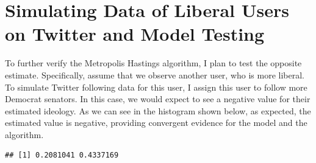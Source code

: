 \documentclass[]{book}
\newenvironment{Shaded}{\begin{snugshade}}{\end{snugshade}}
\newcommand{\KeywordTok}[1]{\textcolor[rgb]{0.13,0.29,0.53}{\textbf{#1}}}
\newcommand{\DataTypeTok}[1]{\textcolor[rgb]{0.13,0.29,0.53}{#1}}
\newcommand{\DecValTok}[1]{\textcolor[rgb]{0.00,0.00,0.81}{#1}}
\newcommand{\StringTok}[1]{\textcolor[rgb]{0.31,0.60,0.02}{#1}}
\newcommand{\CommentTok}[1]{\textcolor[rgb]{0.56,0.35,0.01}{\textit{#1}}}
\newcommand{\OperatorTok}[1]{\textcolor[rgb]{0.81,0.36,0.00}{\textbf{#1}}}
\newcommand{\NormalTok}[1]{#1}
\begin{document}
\section{Simulating Data of Liberal Users on Twitter and Model
Testing}\label{simulating-data-of-liberal-users-on-twitter-and-model-testing}

To further verify the Metropolis Hastings algorithm, I plan to test the
opposite estimate. Specifically, assume that we observe another user,
who is more liberal. To simulate Twitter following data for this user, I
assign this user to follow more Democrat senators. In this case, we
would expect to see a negative value for their estimated ideology. As we
can see in the histogram shown below, as expected, the estimated value
is negative, providing convergent evidence for the model and the
algorithm.

\begin{Shaded}
\end{Shaded}

\begin{verbatim}
## [1] 0.2081041 0.4337169
\end{verbatim}

\begin{Shaded}
\end{Shaded}
\end{document}
